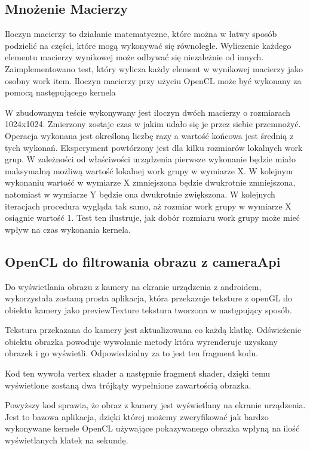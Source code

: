 \subsection[Mnożenie macierzy]{Mnożenie Macierzy}
Iloczyn macierzy to działanie matematyczne, które można w łatwy sposób podzielić na części, które mogą wykonywać się równolegle. Wyliczenie każdego elementu macierzy wynikowej może odbywać się niezależnie od innych. Zaimplementowano test, który wylicza każdy element w wynikowej macierzy jako osobny work item. Iloczyn macierzy przy użyciu OpenCL może być wykonany za pomocą następującego kernela

W zbudowanym teście wykonywany jest iloczyn dwóch macierzy o rozmiarach 1024x1024. Zmierzony zostaje czas w jakim udało się je przez siebie przemnożyć. Operacja wykonana jest określoną liczbę razy a wartość końcowa jest średnią z tych wykonań. Eksperyment powtórzony jest dla kilku rozmiarów lokalnych work grup. W zależności od właściwości urządzenia pierwsze wykonanie będzie miało maksymalną możliwą wartość lokalnej work grupy w wymiarze X. W kolejnym wykonaniu wartość w wymiarze X zmniejszona będzie dwukrotnie zmniejszona, natomiast w wymiarze Y będzie ona dwukrotnie zwiększona. W kolejnych iteracjach procedura wygląda tak samo, aż rozmiar work grupy w wymiarze X osiągnie wartość 1. Test ten ilustruje, jak dobór rozmiaru work grupy może mieć wpływ na czas wykonania kernela.
\subsection[OpenCL do filtrowania obrazu z cameraApi]{OpenCL do filtrowania obrazu z cameraApi}
Do wyświetlania obrazu z kamery na ekranie urządzenia z androidem, wykorzystała zostaną prosta aplikacja, która przekazuje teksture z openGL do obiektu kamery jako previewTexture tekstura tworzona w następujący sposób.

 Tekstura przekazana do kamery jest aktualizowana co każdą klatkę. Odświeżenie obiektu obrazka powoduje wywołanie metody która wyrenderuje uzyskany obrazek i go wyświetli. Odpowiedzialny za to jest ten fragment kodu.
 

Kod ten wywoła vertex shader a następnie fragment shader, dzięki temu wyświetlone zostaną dwa trójkąty wypełnione zawartością obrazka.

Powyższy kod sprawia, że obraz z kamery jest wyświetlany na ekranie urządzenia. Jest to bazowa aplikacja, dzięki której możemy zweryfikować jak bardzo wykonywane kernele OpenCL używające pokazywanego obrazka wpłyną na ilość wyświetlanych klatek na sekundę.
